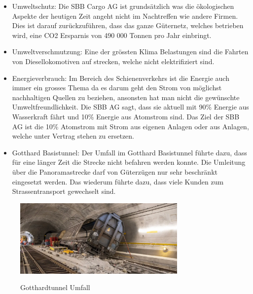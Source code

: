 \documentclass{article}
\begin{document}
\begin{itemize}
\item Umweltschutz:
Die SBB Cargo AG ist grundsätzlich was die ökologischen Aspekte der heutigen Zeit angeht nicht im Nachtreffen wie andere Firmen.
Dies ist darauf zurückzuführen, dass das ganze Güternetz, welches betrieben wird, eine CO2 Ersparnis von 490 000 Tonnen pro Jahr einbringt.

\item Umweltverschmutzung:
Eine der grössten Klima Belastungen sind die Fahrten von Diesellokomotiven auf strecken, welche nicht elektrifiziert sind.   

\item Energieverbrauch: Im Bereich des Schienenverkehrs ist die Energie auch immer ein grosses Thema da es darum geht den Strom von möglichst nachhaltigen Quellen zu beziehen, ansonsten hat man nicht die gewünschte Umweltfreundlichkeit. 
Die SBB AG sagt, dass sie aktuell mit 90\% Energie aus Wasserkraft fährt und 10\% Energie aus Atomstrom sind. Das Ziel der SBB AG ist die 10\% Atomstrom mit Strom aus eigenen Anlagen oder aus Anlagen, welche unter Vertrag stehen zu ersetzen.
\item Gotthard Basistunnel:
Der Umfall im Gotthard Basistunnel führte dazu, dass für eine länger Zeit die Strecke nicht befahren werden konnte.
Die Umleitung über die Panoramastrecke darf von Güterzügen nur sehr beschränkt eingesetzt werden.
Das wiederum führte dazu, dass viele Kunden zum Strassentransport gewechselt sind.
\end{itemize}

\begin{figure}[htbp] %
    \centering
    \includegraphics[width=0.75\textwidth]{umfallGotthard} %
    \caption{Gotthardtunnel Umfall}\parencite[o. S.]{gotthardtunnelBild}
    \label{fig:bildlabel}
\end{figure}
\end{document}
